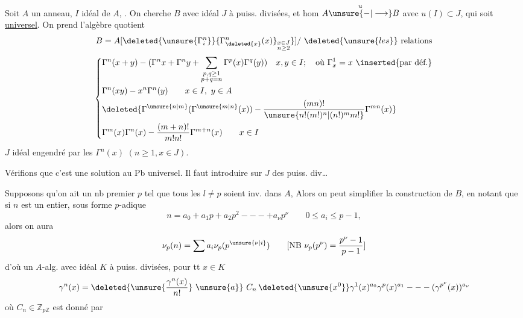 Soit $A$ un anneau, $I$ idéal de $A$, . On cherche  $B$ avec idéal $J$ à puiss. divisées, et hom $A\overset{u}{\unsure{-|\longrightarrow}}B$ avec $u(I)\subset J$, qui soit \uline{universel}. On prend l'algèbre quotient
\[
B=A[\deleted{\unsure{\Gamma_i^n}}\{\Gamma_{\deleted{x}}^n(x)\}_{\substack{x\in J\\n\geq2}}\}]/\ \deleted{\unsure{les}}\ \text{relations}
\]
\[
\left\{\begin{aligned}
&\Gamma^n(x+y)-(\Gamma^n x+\Gamma^n y+\sum_{\substack{p,q\geq1\\p+q=n}}\Gamma^p(x)\Gamma^q(y))\quad x,y\in I;\quad\text{où }\Gamma_x^1=x\ \inserted{\text{par déf.}}\\
&\Gamma^n(xy)-x^n\Gamma^n(y)\qquad x\in I,\ y\in A\\
&\deleted{\Gamma^{\unsure{n|m}}(\Gamma^{\unsure{m|n}}(x))-\frac{(mn)!}{\unsure{n!(m!)^n|(n!)^m m!}}\Gamma^{mn}(x)}\\
&\Gamma^m(x)\Gamma^n(x)-\frac{(m+n)!}{m!n!}\Gamma^{m+n}(x)\qquad x\in I
\end{aligned}\right.
\]
 \uline{$J$} idéal engendré par les $\Gamma^n(x)$ $(n\geq1,x\in J)$.


Vérifions que c'est une solution au Pb universel. Il faut introduire sur $J$ des puiss. div\ldots


Supposons qu'on ait un nb premier $p$ tel que tous les $l\ne p$ soient inv. dans $A$,  Alors on peut simplifier la construction de $B$, en notant que si $n$ est un entier, sous forme $p$-adique 
\[
n=a_0+a_1p+a_2p^2---+a_\nu p^\nu\qquad0\leq a_i\leq p-1,
\]
alors on aura
\[
\nu_p(n)=\sum a_i\nu_p(p^{\unsure{\nu|i}})\qquad[\mathrm{NB}\ \nu_p(p^\nu)=\frac{p^\nu-1}{p-1}]
\]
d'où  un $A$-alg. avec idéal $K$ à puiss. divisées, pour tt $x\in K$
\[
\gamma^n(x)=\deleted{\unsure{\frac{\gamma^n(x)}{n!}}\ \unsure{a}}\ C_n\,\deleted{\unsure{x^0}}\gamma^1(x)^{a_0}\gamma^p(x)^{a_1}---(\gamma^{p^\nu}(x))^{a_\nu}
\]
où $C_n\in\mathbb Z_{p\mathbb Z}$ est donné par
